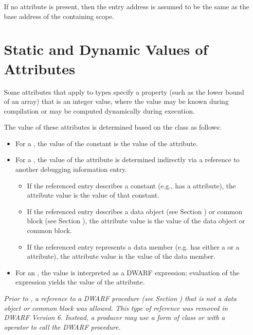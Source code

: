 If no \DWATentrypcNAME{} attribute is present,
then the entry address is assumed to be the same as the
base address of the containing scope.


\section{Static and Dynamic Values of Attributes}
\label{chap:staticanddynamicvaluesofattributes}

Some attributes that apply to types specify a property (such
as the lower bound of an array) that is an integer value,
where the value may be known during compilation or may be
computed dynamically during execution.

The value of these
attributes is determined based on the class as follows:
\begin{itemize}
\item For a , the value
of the constant is the value of the attribute.

\item For a , the value
\bb
of the attribute is determined indirectly via
\eb
a reference to another debugging information entry.
\db
\begin{itemize}
\renewcommand{\itemsep}{0cm}
\bb
\item If the referenced entry describes a constant (e.g., has a
\DWATconstvalue{} attribute), the attribute value is the value
of that constant.

\item If the referenced entry describes a data object
(see Section ) or common block
(see Section ), the attribute
value is the value of the data object or common block.

\item If the referenced entry represents a data member (e.g. has either a
\DWATdatamemberlocation{} or a \DWATdatabitoffset{} attribute), the
attribute value is the value of the data member.
\eb
\end{itemize}

\item For an
\bb
\CLASSexprval,
\eb
the value is interpreted as a DWARF expression; evaluation of
the expression yields the value of the attribute.
\end{itemize}

\bb
\textit{Prior to \DWARFVersionVI, a reference to a DWARF procedure
(see Section )
that is not a data object or common block was allowed. This type of
reference was removed in DWARF Version 6. Instead, a producer may use a form
of class \CLASSexprval{} or \CLASSlocdesc{} with a \DWOPcallref{}
operator to call the DWARF procedure.}
\eb

